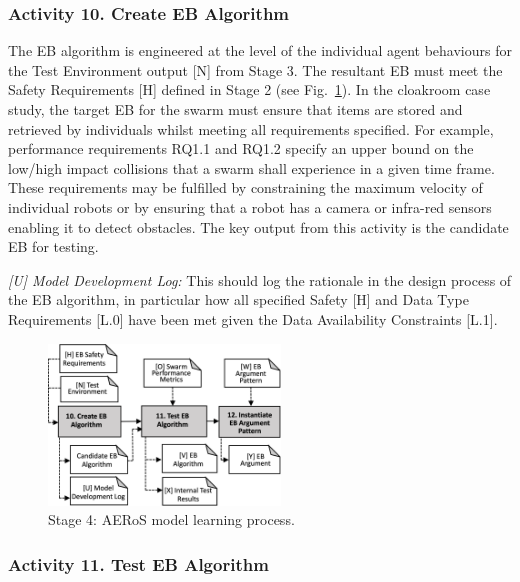 \documentclass[runningheads]{llncs}
\begin{document}
\subsubsection*{Activity 10. Create EB Algorithm}

The EB algorithm is engineered at the level of the individual agent behaviours for the Test Environment output [N] from Stage 3. The resultant EB must meet the Safety Requirements [H] defined in Stage 2 (see Fig.~\ref{amlas-a-stage4}). 
In the cloakroom case study, the target EB for the swarm must ensure that items are stored and retrieved by individuals whilst meeting all requirements specified. For example, performance requirements RQ1.1 and RQ1.2 specify an upper bound on the low/high impact collisions that a swarm shall experience in a given time frame. These requirements may be fulfilled by constraining the maximum velocity of individual robots or by ensuring that a robot has a camera or infra-red sensors enabling it to detect obstacles. The key output from this activity is the candidate EB for testing.

\emph{[U] Model Development Log:} This should log the rationale in the design process of the EB algorithm, in particular how all specified Safety [H] and Data Type Requirements [L.0] have been met given the Data Availability Constraints [L.1].

\begin{figure}[!t]
	\centering
	\includegraphics[width=0.55\textwidth]{figures/AMLAS-STAGE-4-V5.png}%
	\vspace{-2ex}
	\caption{Stage 4: AERoS model learning process.}
	\label{amlas-a-stage4}
	\vspace{-4ex}
\end{figure}

\subsubsection*{Activity 11. Test EB Algorithm}
\end{document}
